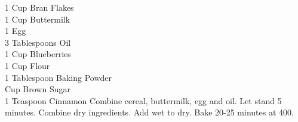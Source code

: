 {1 Cup Bran Flakes \\
 1 Cup Buttermilk \\
 1 Egg \\
 3 Tablespoons Oil \\
 1 Cup Blueberries \\
 1 Cup Flour \\
 1 Tablespoon Baking Powder \\
  Cup Brown Sugar \\
 1 Teaspoon Cinnamon}
{Combine cereal, buttermilk, egg and oil. Let stand 5 minutes. Combine dry ingredients. Add wet to dry. Bake 20-25 minutes at 400\degree.}
